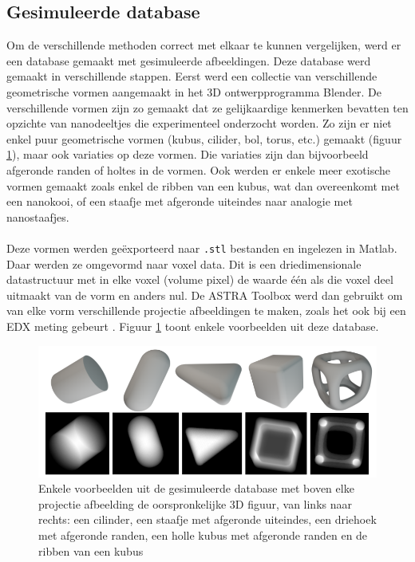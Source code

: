 \documentclass{report}
\begin{document}
\subsection{Gesimuleerde database} \label{ch:simdata}
Om de verschillende methoden correct met elkaar te kunnen vergelijken, werd er een database gemaakt met gesimuleerde afbeeldingen. Deze database werd gemaakt in verschillende stappen. Eerst werd een collectie van verschillende geometrische vormen aangemaakt in het 3D ontwerpprogramma Blender. De verschillende vormen zijn zo gemaakt dat ze gelijkaardige kenmerken bevatten ten opzichte van nanodeeltjes die experimenteel onderzocht worden. Zo zijn er niet enkel puur geometrische vormen (kubus, cilider, bol, torus, etc.) gemaakt (figuur \ref{fig:data_synthdb}), maar ook variaties op deze vormen. Die variaties zijn dan bijvoorbeeld afgeronde randen of holtes in de vormen. Ook werden er enkele meer exotische vormen gemaakt zoals enkel de ribben van een kubus, wat dan overeenkomt met een nanokooi, of een staafje met afgeronde uiteindes naar analogie met nanostaafjes.
\\ \\
Deze vormen werden geëxporteerd naar \texttt{.stl} bestanden en ingelezen in Matlab. Daar werden ze omgevormd naar voxel data. Dit is een driedimensionale datastructuur met in elke voxel (volume pixel) de waarde één als die voxel deel uitmaakt van de vorm en anders nul. De ASTRA Toolbox \cite{software:astra1, software:astra2, software:astragpu} werd dan gebruikt om van elke vorm verschillende projectie afbeeldingen te maken, zoals het ook bij een EDX meting gebeurt \cite{book:williamscarter}. Figuur \ref{fig:data_synthdb} toont enkele voorbeelden uit deze database.
\begin{figure}[h!]
	\centering
	\includegraphics[width=15cm]{images/data/synthdb.png}
	\caption{Enkele voorbeelden uit de gesimuleerde database met boven elke projectie afbeelding de oorspronkelijke 3D figuur, van links naar rechts: een cilinder, een staafje met afgeronde uiteindes, een driehoek met afgeronde randen, een holle kubus met afgeronde randen en de ribben van een kubus}
	\label{fig:data_synthdb}
\end{figure}
\end{document}
